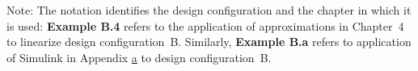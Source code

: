 Note: The notation identifies the design configuration and the chapter
in which it is used: {\bf Example B.4} refers to the application of
approximations in Chapter~4 to linearize design
configuration~B\@. Similarly, {\bf Example B.a} refers to application
of Simulink in Appendix \underline{a} to design configuration~B.

